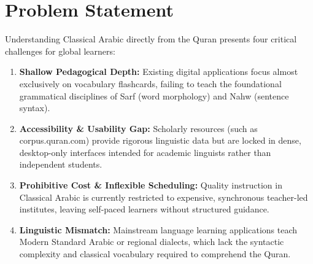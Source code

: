 \documentclass[A4paper,12pt]{article}
\begin{document}
\section{Problem Statement}
Understanding Classical Arabic directly from the Quran presents four critical challenges for global learners:
\begin{enumerate}
    \item \textbf{Shallow Pedagogical Depth:} Existing digital applications focus almost exclusively on vocabulary flashcards, failing to teach the foundational grammatical disciplines of Sarf (word morphology) and Nahw (sentence syntax).
    \item \textbf{Accessibility \& Usability Gap:} Scholarly resources (such as corpus.quran.com) provide rigorous linguistic data but are locked in dense, desktop-only interfaces intended for academic linguists rather than independent students.
    \item \textbf{Prohibitive Cost \& Inflexible Scheduling:} Quality instruction in Classical Arabic is currently restricted to expensive, synchronous teacher-led institutes, leaving self-paced learners without structured guidance.
    \item \textbf{Linguistic Mismatch:} Mainstream language learning applications teach Modern Standard Arabic or regional dialects, which lack the syntactic complexity and classical vocabulary required to comprehend the Quran.
\end{enumerate}
\end{document}
